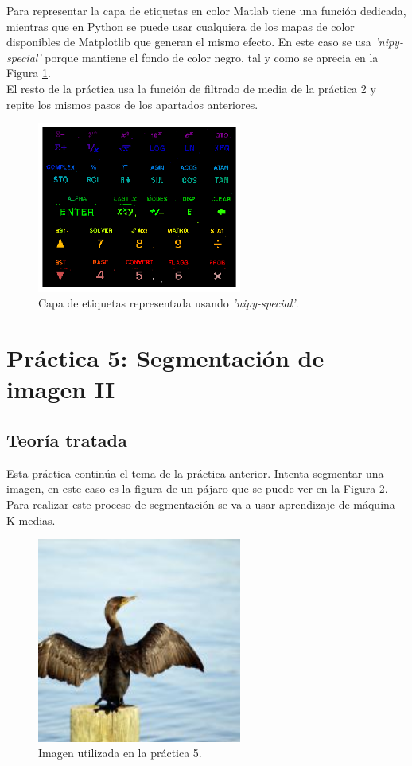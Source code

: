 \documentclass[a4paper,12pt]{report}
\begin{document}
Para representar la capa de etiquetas en color Matlab tiene una función dedicada, mientras que en Python se puede usar cualquiera de los mapas de color disponibles de Matplotlib que generan el mismo efecto. En este caso se usa \emph{'nipy-special'} porque mantiene el fondo de color negro, tal y como se aprecia en la Figura \ref{color}.\\

El resto de la práctica usa la función de filtrado de media de la práctica 2 y repite los mismos pasos de los apartados anteriores.

\begin{figure}[h]
\centering
\includegraphics[width=0.6\textwidth]{imagenes/color}
\caption{Capa de etiquetas representada usando \emph{'nipy-special'}.}
\label{color}
\end{figure}


\section{ Práctica 5: Segmentación de imagen II}
\subsection{Teoría tratada}

Esta práctica continúa el tema de la práctica anterior. Intenta segmentar una imagen, en este caso es la figura de un pájaro que se puede ver en la Figura \ref{cormoran}. Para realizar este proceso de segmentación se va a usar aprendizaje de máquina K-medias.\\
\begin{figure}[h]
\centering
\includegraphics[width=0.6\textwidth]{imagenes/cormoran_rgb}
\caption{Imagen utilizada en la práctica 5.}
\label{cormoran}
\end{figure}
\end{document}
